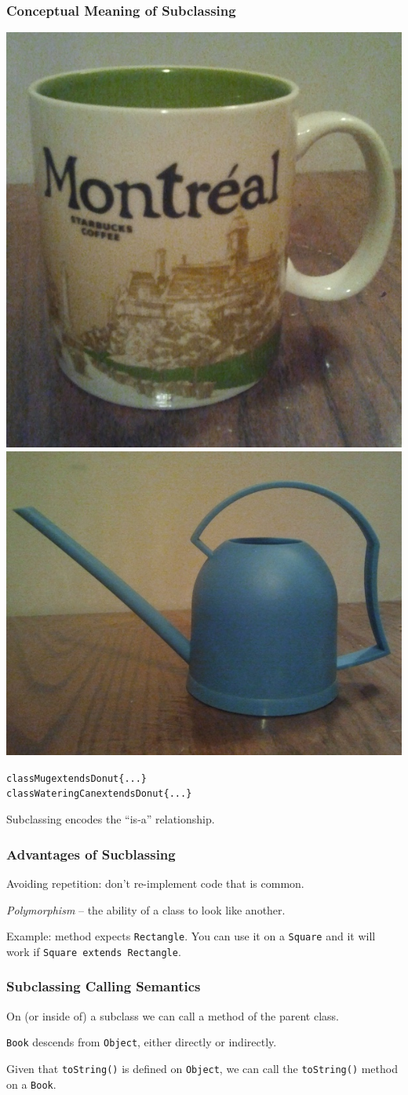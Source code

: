 \begin{frame}
\frametitle{Conceptual Meaning of Subclassing}

\begin{center}
\includegraphics[width=.3\textwidth]{images/mug-scaled}
\includegraphics[width=.41\textwidth]{images/wateringcan-scaled.jpg}
\end{center}
\begin{alltt}
  class Mug extends Donut \{ ... \}\\
  class WateringCan extends Donut \{ ... \}
\end{alltt}

\begin{changemargin}{1.5cm}
\alert{\Large Subclassing encodes the ``is-a'' relationship.}
\end{changemargin}

\end{frame}

\begin{frame}
\frametitle{Advantages of Sucblassing}
\begin{changemargin}{1cm}
Avoiding repetition: don't re-implement code that is common.

\textit{Polymorphism} -- the ability of a class to look like another. 

Example: method expects \texttt{Rectangle}. You can use it on a \texttt{Square} and it will work if \texttt{Square extends Rectangle}.
\end{changemargin}
\end{frame}

\begin{frame}
\frametitle{Subclassing Calling Semantics}
\begin{changemargin}{1cm}

On (or inside of) a subclass we can call a method of the parent class. 

\texttt{Book} descends from \texttt{Object}, either directly or indirectly. 

Given that \texttt{toString()} is defined on \texttt{Object}, we can call the \texttt{toString()} method on a \texttt{Book}.

\end{changemargin}
\end{frame}

